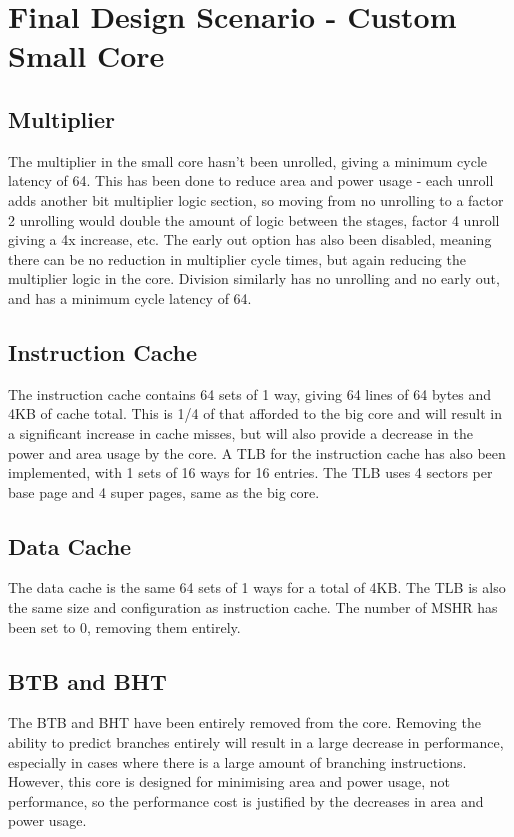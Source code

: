 \section{Final Design Scenario - Custom Small Core}
\subsection{Multiplier}
The multiplier in the small core hasn't been unrolled, giving a minimum cycle latency of 64. This has been done to reduce area and power usage - each unroll adds another bit multiplier logic section, so moving from no unrolling to a factor 2 unrolling would double the amount of logic between the stages, factor 4 unroll giving a 4x increase, etc. The early out option has also been disabled, meaning there can be no reduction in multiplier cycle times, but again reducing the multiplier logic in the core. Division similarly has no unrolling and no early out, and has a minimum cycle latency of 64.

\subsection{Instruction Cache}
The instruction cache contains 64 sets of 1 way, giving 64 lines of 64 bytes and 4KB of cache total. This is 1/4 of that afforded to the big core and will result in a significant increase in cache misses, but will also provide a decrease in the power and area usage by the core. A TLB for the instruction cache has also been implemented, with 1 sets of 16 ways for 16 entries. The TLB uses 4 sectors per base page and 4 super pages, same as the big core.

\subsection{Data Cache}
The data cache is the same 64 sets of 1 ways for a total of 4KB. The TLB is also the same size and configuration as instruction cache. The number of MSHR has been set to 0, removing them entirely.

\subsection{BTB and BHT}
The BTB and BHT have been entirely removed from the core. Removing the ability to predict branches entirely will result in a large decrease in performance, especially in cases where there is a large amount of branching instructions. However, this core is designed for minimising area and power usage, not performance, so the performance cost is justified by the decreases in area and power usage.

